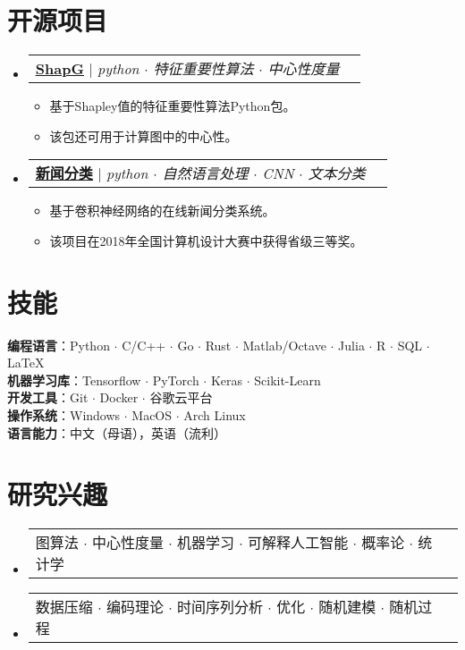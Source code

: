 \documentclass[UTF8,10pt]{ctexart}
\makeatletter
\newcommand{\link}[2]{\href{#1}{\color{blue}\underline{#2}}}
\newcommand{\resumeItem}[1]{
  \item\small{
    {#1 \vspace{-2pt}}
  }
}
\newcommand{\resumeProjectHeading}[2]{
  \item
  \begin{tabular*}{0.97\textwidth}{l@{\extracolsep{\fill}}r}
    \small#1 & #2 \\
  \end{tabular*}\vspace{-7pt}
}
\newenvironment{resumeSubHeadingList}{\begin{itemize}[leftmargin=0.15in, label={}]}{\end{itemize}}
\newenvironment{resumeItemList}{\begin{itemize}}{\end{itemize}}
\makeatother
\begin{document}
\section{开源项目}
\begin{resumeSubHeadingList}

  \resumeProjectHeading{
    \link{https://github.com/vectorsss/shapG}{\textbf{ShapG}} $|$
    \emph{python $\cdot$ 特征重要性算法 $\cdot$ 中心性度量}}{}
  \begin{resumeItemList}
    \resumeItem{基于Shapley值的特征重要性算法Python包。}
    \resumeItem{该包还可用于计算图中的中心性。}
  \end{resumeItemList}

  \resumeProjectHeading{
    \link{https://github.com/vectorsss/news_classification}{\textbf{新闻分类}} $|$
    \emph{python $\cdot$ 自然语言处理 $\cdot$ CNN $\cdot$ 文本分类}}{}
  \begin{resumeItemList}
    \resumeItem{基于卷积神经网络的在线新闻分类系统。}
    \resumeItem{该项目在2018年全国计算机设计大赛中获得省级三等奖。}
  \end{resumeItemList}
\end{resumeSubHeadingList}

\section{技能}
\begin{itemize}[leftmargin=0.15in, label={}]
  \small{\item{
        \textbf{编程语言}{：Python $\cdot$ C/C++ $\cdot$ Go $\cdot$ Rust $\cdot$ Matlab/Octave $\cdot$ Julia $\cdot$ R $\cdot$ SQL $\cdot$ \LaTeX} \\
        \textbf{机器学习库}{：Tensorflow $\cdot$  PyTorch $\cdot$ Keras $\cdot$  Scikit-Learn} \\
        \textbf{开发工具}{：Git $\cdot$ Docker $\cdot$  谷歌云平台} \\
        \textbf{操作系统}{：Windows $\cdot$ MacOS $\cdot$ Arch Linux} \\
        \textbf{语言能力}{：中文（母语），英语（流利）}
        }}
\end{itemize}

\section{研究兴趣}
\begin{resumeSubHeadingList}
  \resumeProjectHeading{
    图算法 $\cdot$ 中心性度量 $\cdot$ 机器学习
    $\cdot$ 可解释人工智能 $\cdot$ 概率论
    $\cdot$ 统计学}{}
  \resumeProjectHeading{
    数据压缩 $\cdot$ 编码理论 $\cdot$ 时间序列分析 $\cdot$
    优化 $\cdot$ 随机建模 $\cdot$ 随机过程}{}
\end{resumeSubHeadingList}
\end{document}
